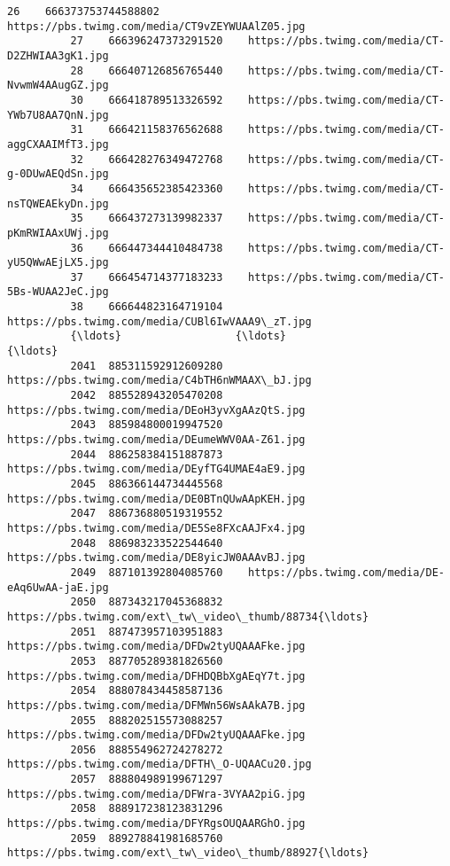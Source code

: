 \documentclass[11pt]{article}
\begin{document}
\begin{Verbatim}[commandchars=\\\{\}]
          26    666373753744588802    https://pbs.twimg.com/media/CT9vZEYWUAAlZ05.jpg   
          27    666396247373291520    https://pbs.twimg.com/media/CT-D2ZHWIAA3gK1.jpg   
          28    666407126856765440    https://pbs.twimg.com/media/CT-NvwmW4AAugGZ.jpg   
          30    666418789513326592    https://pbs.twimg.com/media/CT-YWb7U8AA7QnN.jpg   
          31    666421158376562688    https://pbs.twimg.com/media/CT-aggCXAAIMfT3.jpg   
          32    666428276349472768    https://pbs.twimg.com/media/CT-g-0DUwAEQdSn.jpg   
          34    666435652385423360    https://pbs.twimg.com/media/CT-nsTQWEAEkyDn.jpg   
          35    666437273139982337    https://pbs.twimg.com/media/CT-pKmRWIAAxUWj.jpg   
          36    666447344410484738    https://pbs.twimg.com/media/CT-yU5QWwAEjLX5.jpg   
          37    666454714377183233    https://pbs.twimg.com/media/CT-5Bs-WUAA2JeC.jpg   
          38    666644823164719104    https://pbs.twimg.com/media/CUBl6IwVAAA9\_zT.jpg   
          {\ldots}                  {\ldots}                                                {\ldots}   
          2041  885311592912609280    https://pbs.twimg.com/media/C4bTH6nWMAAX\_bJ.jpg   
          2042  885528943205470208    https://pbs.twimg.com/media/DEoH3yvXgAAzQtS.jpg   
          2043  885984800019947520    https://pbs.twimg.com/media/DEumeWWV0AA-Z61.jpg   
          2044  886258384151887873    https://pbs.twimg.com/media/DEyfTG4UMAE4aE9.jpg   
          2045  886366144734445568    https://pbs.twimg.com/media/DE0BTnQUwAApKEH.jpg   
          2047  886736880519319552    https://pbs.twimg.com/media/DE5Se8FXcAAJFx4.jpg   
          2048  886983233522544640    https://pbs.twimg.com/media/DE8yicJW0AAAvBJ.jpg   
          2049  887101392804085760    https://pbs.twimg.com/media/DE-eAq6UwAA-jaE.jpg   
          2050  887343217045368832  https://pbs.twimg.com/ext\_tw\_video\_thumb/88734{\ldots}   
          2051  887473957103951883    https://pbs.twimg.com/media/DFDw2tyUQAAAFke.jpg   
          2053  887705289381826560    https://pbs.twimg.com/media/DFHDQBbXgAEqY7t.jpg   
          2054  888078434458587136    https://pbs.twimg.com/media/DFMWn56WsAAkA7B.jpg   
          2055  888202515573088257    https://pbs.twimg.com/media/DFDw2tyUQAAAFke.jpg   
          2056  888554962724278272    https://pbs.twimg.com/media/DFTH\_O-UQAACu20.jpg   
          2057  888804989199671297    https://pbs.twimg.com/media/DFWra-3VYAA2piG.jpg   
          2058  888917238123831296    https://pbs.twimg.com/media/DFYRgsOUQAARGhO.jpg   
          2059  889278841981685760  https://pbs.twimg.com/ext\_tw\_video\_thumb/88927{\ldots}   

\end{Verbatim}
\end{document}
